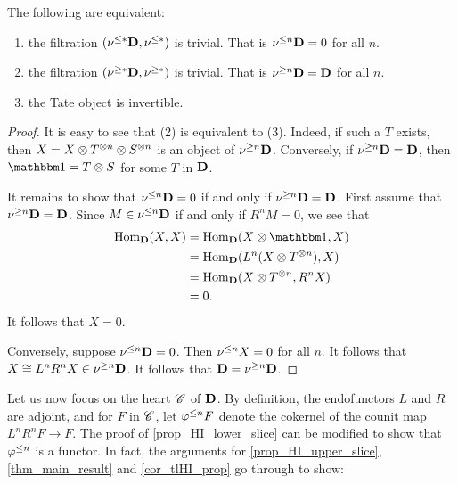 \begin{prop}\label{prop_filt_trivial_cond}
The following are equivalent:
\begin{enumerate}
\item the filtration $(\nu^{\leq *}\mathbf{D}, \nu^{\leq *})$ is trivial. 
That is $\nu^{\leq n}\mathbf{D} = 0$ for all $n$.

\item the filtration $(\nu^{\geq *}\mathbf{D}, \nu^{\geq *})$ is trivial.
That is $\nu^{\geq n}\mathbf{D} = \mathbf{D}$ for all $n$.

\item the Tate object is invertible.
\end{enumerate}
\end{prop}
\begin{proof}
It is easy to see that (2) is equivalent to (3). Indeed, if such
a $T$ exists, then $X = X \otimes T^{\otimes n} \otimes 
S^{\otimes n}$ is an object of $\nu^{\geq n}\mathbf{D}$. Conversely, if
$\nu^{\geq n}\mathbf{D} = \mathbf{D}$, then $\Unit = T \tensor S$ for some
$T$ in $\mathbf{D}$.

It remains to show that $\nu^{\leq n}\mathbf{D} = 0$ if and only if
$\nu^{\geq n}\mathbf{D} = \mathbf{D}$. First assume that $\nu^{\geq n}\mathbf{D} = 
\mathbf{D}$. Since $M \in \nu^{\leq n}\mathbf{D}$ if and only if $R^n M = 0$,
we see that
\begin{align*}
\hom_{\DCat}(X, X) &= \hom_{\DCat}(X \tensor \Unit, X) \\
&= \hom_{\DCat}(L^n(X \tensor T^{\tensor n}), X) \\
&= \hom_{\DCat}(X \tensor T^{\tensor n}, R^n X) \\
&= 0.
\end{align*}
It follows that $X = 0$.

Conversely, suppose $\nu^{\leq n}\mathbf{D} = 0$. Then $\nu^{\leq n}X = 0$
for all $n$. It follows that $X \cong L^n R^n X \in 
\nu^{\geq n}\mathbf{D}$. It follows that $\mathbf{D} = \nu^{\geq n}\mathbf{D}$.
\end{proof}

Let us now focus on the heart $\mathscr{C}$ of $\mathbf{D}$. By definition,
the endofunctors $L$ and $R$ are adjoint, and for $F$ in 
$\mathscr{C}$, let $\varphi^{\leq n} F$ denote the cokernel of the counit map 
$L^n R^n F \to F$. The proof of \ref{prop_HI_lower_slice} can be
modified to show that $\varphi^{\leq n}$ is a functor. In fact, the 
arguments for \ref{prop_HI_upper_slice}, \ref{thm_main_result} and 
\ref{cor_tlHI_prop} go through to show:

